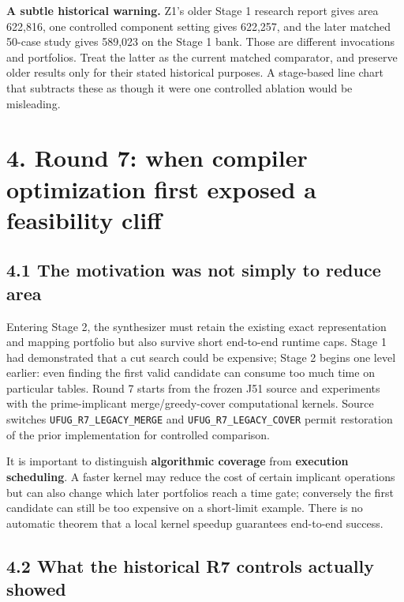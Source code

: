 \textbf{A subtle historical warning.} Z1's older Stage 1 research report gives area 622,816, one controlled component setting gives 622,257, and the later matched 50-case study gives 589,023 on the Stage 1 bank. Those are different invocations and portfolios. Treat the latter as the current matched comparator, and preserve older results only for their stated historical purposes. A stage-based line chart that subtracts these as though it were one controlled ablation would be misleading.

\section{4. Round 7: when compiler optimization first exposed a feasibility cliff}\label{round-7-when-compiler-optimization-first-exposed-a-feasibility-cliff}

\subsection{4.1 The motivation was not simply to reduce area}\label{the-motivation-was-not-simply-to-reduce-area}

Entering Stage 2, the synthesizer must retain the existing exact representation and mapping portfolio but also survive short end-to-end runtime caps. Stage 1 had demonstrated that a cut search could be expensive; Stage 2 begins one level earlier: even finding the first valid candidate can consume too much time on particular tables. Round 7 starts from the frozen J51 source and experiments with the prime-implicant merge/greedy-cover computational kernels. Source switches \texttt{UFUG\_R7\_LEGACY\_MERGE} and \texttt{UFUG\_R7\_LEGACY\_COVER} permit restoration of the prior implementation for controlled comparison.

It is important to distinguish \textbf{algorithmic coverage} from \textbf{execution scheduling}. A faster kernel may reduce the cost of certain implicant operations but can also change which later portfolios reach a time gate; conversely the first candidate can still be too expensive on a short-limit example. There is no automatic theorem that a local kernel speedup guarantees end-to-end success.

\subsection{4.2 What the historical R7 controls actually showed}\label{what-the-historical-r7-controls-actually-showed}

